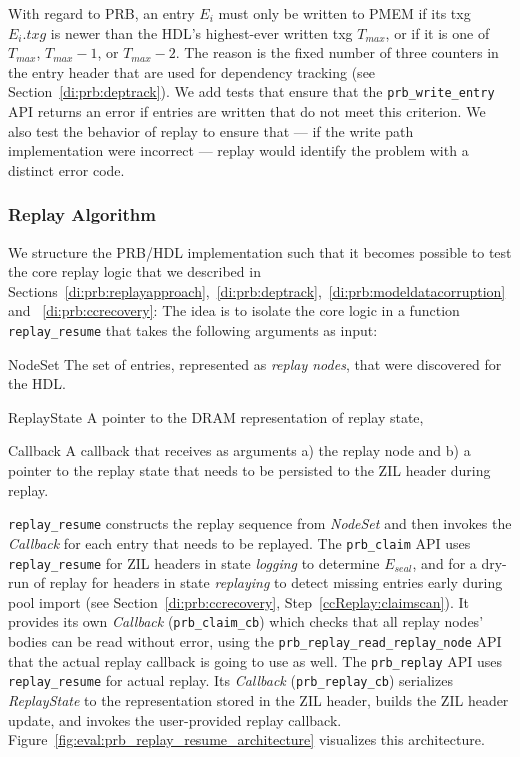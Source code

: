 \documentclass[12pt,a4paper,twoside]{book}
\begin{document}
{With regard to PRB, an entry $E_i$ must only be written to PMEM if its txg $E_i.txg$ is newer than the HDL's highest-ever written txg $T_{max}$, or if it is one of $T_{max}$, $T_{max}-1$, or $T_{max}-2$.
The reason is the fixed number of three counters in the entry header that are used for dependency tracking (see Section~\ref{di:prb:deptrack}).
We add tests that ensure that the \lstinline{prb_write_entry} API returns an error if entries are written that do not meet this criterion.
We also test the behavior of replay to ensure that --- if the write path implementation were incorrect --- replay would identify the problem with a distinct error code.

\subsubsection{Replay Algorithm}
We structure the PRB/HDL implementation such that it becomes possible to test the core replay logic that we described in Sections~\ref{di:prb:replayapproach},~\ref{di:prb:deptrack},~\ref{di:prb:modeldatacorruption} and ~\ref{di:prb:ccrecovery}:
The idea is to isolate the core logic in a function \lstinline{replay_resume} that takes the following arguments as input:
\begin{description}[noitemsep,leftmargin=1.5cm,labelindent=1cm]
    \item[NodeSet] The set of entries, represented as \textit{replay nodes}, that were discovered for the HDL.
    \item[ReplayState] A pointer to the DRAM representation of replay state,
    \item[Callback] A callback that receives as arguments
    a) the replay node and b) a pointer to the replay state that needs to be persisted to the ZIL header during replay.
\end{description}
\lstinline{replay_resume} constructs the replay sequence from \textit{NodeSet} and then invokes the \textit{Callback} for each entry that needs to be replayed.
The \lstinline{prb_claim} API uses \lstinline{replay_resume} for ZIL headers in state \textit{logging} to determine $E_{seal}$, and for a dry-run of replay for headers in state \textit{replaying} to detect missing entries early during pool import (see Section~\ref{di:prb:ccrecovery}, Step~\ref{ccReplay:claimscan}).
It provides its own \textit{Callback} (\lstinline{prb_claim_cb}) which checks that all replay nodes' bodies can be read without error, using the \lstinline{prb_replay_read_replay_node} API that the actual replay callback is going to use as well.
The \lstinline{prb_replay} API uses \lstinline{replay_resume} for actual replay.
Its \textit{Callback} (\lstinline{prb_replay_cb}) serializes \textit{ReplayState} to the representation stored in the ZIL header, builds the ZIL header update, and invokes the user-provided replay callback.
Figure~\ref{fig:eval:prb_replay_resume_architecture} visualizes this architecture.

}
\end{document}
